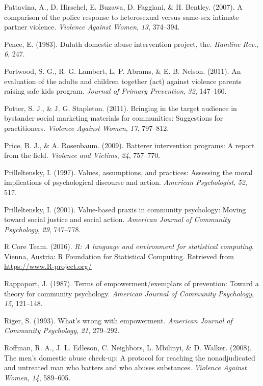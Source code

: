 \documentclass[11pt,]{tufte-book}
\begin{document}
\hypertarget{ref-pattavina2007comparison}{}
Pattavina, A., D. Hirschel, E. Buzawa, D. Faggiani, \& H. Bentley.
(2007). A comparison of the police response to heterosexual versus
same-sex intimate partner violence. \emph{Violence Against Women},
\emph{13}, 374--394.

\hypertarget{ref-pence1983duluth}{}
Pence, E. (1983). Duluth domestic abuse intervention project, the.
\emph{Hamline Rev.}, \emph{6}, 247.

\hypertarget{ref-portwood2011evaluation}{}
Portwood, S. G., R. G. Lambert, L. P. Abrams, \& E. B. Nelson. (2011).
An evaluation of the adults and children together (act) against violence
parents raising safe kids program. \emph{Journal of Primary Prevention},
\emph{32}, 147--160.

\hypertarget{ref-potter2011bringing}{}
Potter, S. J., \& J. G. Stapleton. (2011). Bringing in the target
audience in bystander social marketing materials for communities:
Suggestions for practitioners. \emph{Violence Against Women}, \emph{17},
797--812.

\hypertarget{ref-price2009batterer}{}
Price, B. J., \& A. Rosenbaum. (2009). Batterer intervention programs: A
report from the field. \emph{Violence and Victims}, \emph{24}, 757--770.

\hypertarget{ref-prilleltensky1997values}{}
Prilleltensky, I. (1997). Values, assumptions, and practices: Assessing
the moral implications of psychological discourse and action.
\emph{American Psychologist}, \emph{52}, 517.

\hypertarget{ref-prilleltensky2001value-based}{}
Prilleltensky, I. (2001). Value-based praxis in community psychology:
Moving toward social justice and social action. \emph{American Journal
of Community Psychology}, \emph{29}, 747--778.

\hypertarget{ref-R-base}{}
R Core Team. (2016). \emph{R: A language and environment for statistical
computing}. Vienna, Austria: R Foundation for Statistical Computing.
Retrieved from \url{https://www.R-project.org/}

\hypertarget{ref-rappaport1987terms}{}
Rappaport, J. (1987). Terms of empowerment/exemplars of prevention:
Toward a theory for community psychology. \emph{American Journal of
Community Psychology}, \emph{15}, 121--148.

\hypertarget{ref-riger1993what}{}
Riger, S. (1993). What's wrong with empowerment. \emph{American Journal
of Community Psychology}, \emph{21}, 279--292.

\hypertarget{ref-roffman2008mens}{}
Roffman, R. A., J. L. Edleson, C. Neighbors, L. Mbilinyi, \& D. Walker.
(2008). The men's domestic abuse check-up: A protocol for reaching the
nonadjudicated and untreated man who batters and who abuses substances.
\emph{Violence Against Women}, \emph{14}, 589--605.
\end{document}
